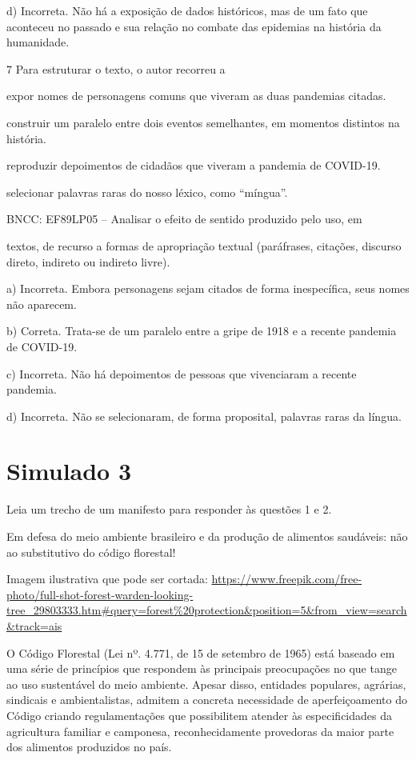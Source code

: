 \begin{escolha}
\begin{escolha}
\begin{escolha}
\begin{escolha}
\begin{escolha}
d) Incorreta. Não há a exposição de dados históricos, mas de um fato que
aconteceu no passado e sua relação no combate das epidemias na história
da humanidade.

\num{7} Para estruturar o texto, o autor recorreu a

\begin{escolha}
\item expor nomes de personagens comuns que viveram as duas pandemias
citadas.

\item construir um paralelo entre dois eventos semelhantes, em momentos
distintos na história.

\item reproduzir depoimentos de cidadãos que viveram a pandemia de
COVID-19.

\item selecionar palavras raras do nosso léxico, como ``míngua''.

\end{escolha}BNCC: EF89LP05 -- Analisar o efeito de sentido produzido pelo uso, em

textos, de recurso a formas de apropriação textual (paráfrases,
citações, discurso direto, indireto ou indireto livre).

a) Incorreta. Embora personagens sejam citados de forma inespecífica,
seus nomes não aparecem.

b) Correta. Trata-se de um paralelo entre a gripe de 1918 e a recente
pandemia de COVID-19.

c) Incorreta. Não há depoimentos de pessoas que vivenciaram a recente
pandemia.

d) Incorreta. Não se selecionaram, de forma proposital, palavras raras
da língua.

\chapter{Simulado 3}

Leia um trecho de um manifesto para responder às questões 1 e 2.

Em defesa do meio ambiente brasileiro e da produção de alimentos
saudáveis: não ao substitutivo do código florestal!

Imagem ilustrativa que pode ser cortada:
\url{https://www.freepik.com/free-photo/full-shot-forest-warden-looking-tree_29803333.htm\#query=forest\%20protection\&position=5\&from_view=search\&track=ais}

O Código Florestal (Lei nº. 4.771, de 15 de setembro de 1965) está
baseado em uma série de princípios que respondem às principais
preocupações no que tange ao uso sustentável do meio ambiente. Apesar
disso, entidades populares, agrárias, sindicais e ambientalistas,
admitem a concreta necessidade de aperfeiçoamento do Código criando
regulamentações que possibilitem atender às especificidades da
agricultura familiar e camponesa, reconhecidamente provedoras da maior
parte dos alimentos produzidos no país.


\end{escolha}
\end{escolha}
\end{escolha}
\end{escolha}
\end{escolha}
